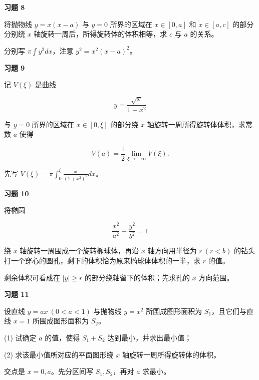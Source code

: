 \begin{exercisebox}
\textbf{习题 8 }

将抛物线 \(y=x(x-a)\) 与 \(y=0\) 所界的区域在 \(x\in[0,a]\) 和 \(x\in[a,c]\) 的部分分别绕 \(x\) 轴旋转一周后，所得旋转体的体积相等，求 \(c\) 与 \(a\) 的关系。

\begin{hintbox}
分别写 \(\pi\int y^2dx\)，注意 \(y^2=x^2(x-a)^2\)。
\end{hintbox}
\end{exercisebox}

\begin{exercisebox}
\textbf{习题 9 }

记 \(V(\xi)\) 是曲线

\[
      y=\frac{\sqrt{x}}{1+x^2}
      \]

与 \(y=0\) 所界的区域在 \(x\in[0,\xi]\) 的部分绕 \(x\) 轴旋转一周所得旋转体体积，求常数 \(a\) 使得

\[
      V(a)=\frac12\lim_{\xi\to+\infty}V(\xi).
      \]

\begin{hintbox}
先写 \(V(\xi)=\pi\int_0^\xi \frac{x}{(1+x^2)^2}dx\)。
\end{hintbox}
\end{exercisebox}

\begin{exercisebox}
\textbf{习题 10 }

将椭圆

\[
      \frac{x^2}{a^2}+\frac{y^2}{b^2}=1
      \]

绕 \(x\) 轴旋转一周围成一个旋转椭球体，再沿 \(x\) 轴方向用半径为 \(r\ (r<b)\) 的钻头打一个穿心的圆孔，剩下的体积恰为原来椭球体体积的一半，求 \(r\) 的值。

\begin{hintbox}
剩余体积可看成在 \(|y|\ge r\) 的部分绕轴留下的体积；先求孔的 \(x\) 方向范围。
\end{hintbox}
\end{exercisebox}

\begin{exercisebox}
\textbf{习题 11 }

设直线 \(y=ax\ (0<a<1)\) 与抛物线 \(y=x^2\) 所围成图形面积为 \(S_1\)，且它们与直线 \(x=1\) 所围成图形面积为 \(S_2\)。

(1) 试确定 \(a\) 的值，使得 \(S_1+S_2\) 达到最小，并求出最小值；

(2) 求该最小值所对应的平面图形绕 \(x\) 轴旋转一周所得旋转体的体积。

\begin{hintbox}
交点是 \(x=0,a\)。先分区间写 \(S_1,S_2\)，再对 \(a\) 求最小。
\end{hintbox}
\end{exercisebox}

